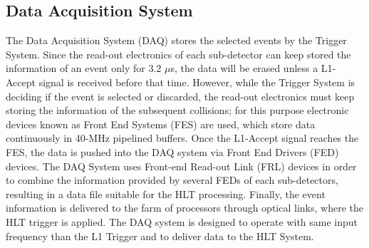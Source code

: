 



\subsection{Data Acquisition System}
\label{subsec:Trigger}

\noindent The Data Acquisition System (DAQ) stores the selected events by the Trigger System. Since 
the read-out electronics of each sub-detector can keep stored the information of an event 
only for 3.2 $\mu$s, the data will be erased unless a L1-Accept signal is received before 
that time. However, while the Trigger System is deciding if the event is selected or discarded, the 
read-out electronics must keep storing the information of the subsequent collisions; for 
this purpose electronic devices known as Front End Systems (FES) are used, which store data continuously 
in 40-MHz pipelined buffers. Once the L1-Accept signal reaches the FES, the 
data is pushed into the DAQ system via Front End Drivers (FED) devices. The DAQ System
uses Front-end Read-out Link (FRL) devices in order to combine the information provided 
by several FEDs of each sub-detectors, resulting in a data file suitable for the HLT processing. Finally,
the event information is delivered to the farm of processors through optical links, where the HLT
trigger is applied. The DAQ system is designed to operate with same input frequency 
than the L1 Trigger and to deliver data to the HLT System.


  


